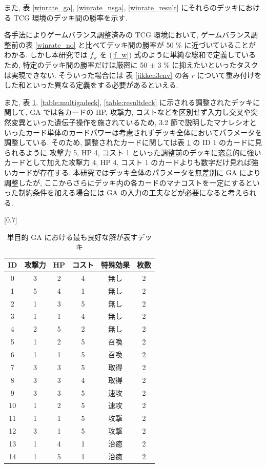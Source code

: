 \documentclass[12pt]{jarticle}
\begin{document}
また, 表 \ref{winrate_ga}, \ref{winrate_nsga}, \ref{winrate_result} にそれらのデッキにおける TCG 環境のデッキ間の勝率を示す. \par 
各手法によりゲームバランス調整済みの TCG 環境において, ゲームバランス調整前の表 \ref{winrate_no} と比べてデッキ間の勝率が 50 \% に近づいていることがわかる. しかし本研究では $f_\mathrm{w}$ を (\ref{f_w}) 式のように単純な総和で定義しているため, 特定のデッキ間の勝率だけは厳密に 50 $\pm$ 3 \% に抑えたいといったタスクは実現できない. そういった場合には 表 \ref{jikken3env} の各 $r$ について重み付けをした和といった異なる定義をする必要があるといえる.\par
また, 表 \ref{table:monogadeck}, \ref{table:multigadeck}, \ref{table:resultdeck} に示される調整されたデッキに関して, GA では各カードの HP, 攻撃力, コストなどを区別せず入力し交叉や突然変異といった遺伝子操作を施されているため, 3.2 節で説明したマナレシオといったカード単体のカードパワーは考慮されずデッキ全体においてパラメータを調整している.
そのため, 調整されたカードに関しては表 \ref{table:monogadeck} の ID 1 のカードに見られるように 攻撃力 5, HP 4, コスト 1 といった調整前のデッキに恣意的に強いカードとして加えた攻撃力 4, HP 4, コスト 1 のカードよりも数字だけ見れば強いカードが存在する. 
本研究ではデッキ全体のパラメータを無差別に GA により調整したが, ここからさらにデッキ内の各カードのマナコストを一定にするといった制約条件を加える場合には GA の入力の工夫などが必要になると考えられる.


\begin{table}[t]
  \centering
  \caption{単目的 GA における最も良好な解が表すデッキ}
  \label{table:monogadeck}
  \vspace{-0.3cm}
  \scalebox{0.7}[0.7]{
    \begin{tabular}{|c|c|c|c|c|c|}
      \hline
      ID & 攻撃力 & HP & コスト & 特殊効果 & 枚数 \\ \hline \hline
      0 & 3 & 2 & 4 & 無し & 2 \\ \hline
      1 & 5 & 4 & 1 & 無し & 2 \\ \hline
      2 & 1 & 3 & 5 & 無し & 2 \\ \hline
      3 & 1 & 1 & 4 & 無し & 2 \\ \hline
      4 & 2 & 5 & 2 & 無し & 2 \\ \hline
      5 & 1 & 2 & 5 & 召喚 & 2 \\ \hline
      6 & 1 & 1 & 5 & 召喚 & 2 \\ \hline
      7 & 3 & 3 & 5 & 取得 & 2 \\ \hline
      8 & 3 & 3 & 4 & 取得 & 2 \\ \hline
      9 & 3 & 3 & 5 & 速攻 & 2 \\ \hline
      10 & 1 & 2 & 5 & 速攻 & 2 \\ \hline
      11 & 1 & 1 & 5 & 攻撃 & 2 \\ \hline
      12 & 3 & 1 & 5 & 攻撃 & 2 \\ \hline
      13 & 1& 4 & 1 & 治癒 & 2 \\ \hline
      14 & 1 & 5 & 1 & 治癒 & 2 \\ \hline
      \end{tabular}
  }
  
  \end{table}
\end{document}
